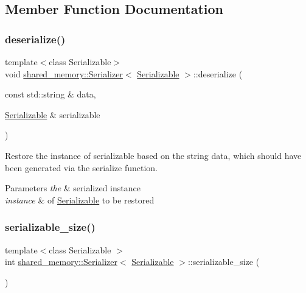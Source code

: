 \subsection{Member Function Documentation}
\mbox{\label{classshared__memory_1_1Serializer_a8f674c9b3a7c053403112d2fad4e09a9}} 
\subsubsection{\texorpdfstring{deserialize()}{deserialize()}}
{\footnotesize\ttfamily template$<$class Serializable$>$ \\
void \hyperlink{classshared__memory_1_1Serializer}{shared\+\_\+memory\+::\+Serializer}$<$ \hyperlink{classSerializable}{Serializable} $>$\+::deserialize (\begin{DoxyParamCaption}\item[{const std\+::string \&}]{data,  }\item[{\hyperlink{classSerializable}{Serializable} \&}]{serializable }\end{DoxyParamCaption})}



Restore the instance of serializable based on the string data, which should have been generated via the serialize function. 


\begin{DoxyParams}{Parameters}
{\em the} & serialized instance \\
\hline
{\em instance} & of \hyperlink{classSerializable}{Serializable} to be restored \\
\hline
\end{DoxyParams}
\mbox{\label{classshared__memory_1_1Serializer_af5edd0af254d6061e8e18c0bbec10aa9}} 
\subsubsection{\texorpdfstring{serializable\+\_\+size()}{serializable\_size()}}
{\footnotesize\ttfamily template$<$class Serializable $>$ \\
int \hyperlink{classshared__memory_1_1Serializer}{shared\+\_\+memory\+::\+Serializer}$<$ \hyperlink{classSerializable}{Serializable} $>$\+::serializable\+\_\+size (\begin{DoxyParamCaption}{ }\end{DoxyParamCaption})\hspace{0.3cm}{\ttfamily [static]}}



